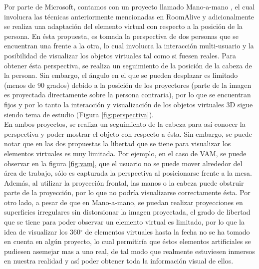 \documentclass[a4paper,openright,12pt]{report}
\begin{document}
Por parte de Microsoft\textregistered, contamos con un proyecto llamado Mano-a-mano \citep{benko2014}, el cual involucra las técnicas anteriormente mencionadas en RoomAlive y adicionalmente se realiza una adaptación del elemento virtual con respecto a la posición de la persona. En ésta propuesta, es tomada la perspectiva de dos personas que se encuentran una frente a la otra, lo cual involucra la interacción multi-usuario y la posibilidad de visualizar los objetos virtuales tal como si fuesen reales. Para obtener ésta perspectiva, se realiza un seguimiento de la posición de la cabeza de la persona. Sin embargo, el ángulo en el que se pueden desplazar es limitado (menos de 90 grados) debido a la posición de los proyectores (parte de la imagen es proyectada directamente sobre la persona contraria), por lo que se encuentran fijos y por lo tanto la interacción y visualización de los objetos virtuales 3D sigue siendo tema de estudio (Figura \ref{fig:perspectiva}).\\
En ambos proyectos, se realiza un seguimiento de la cabeza para así conocer la perspectiva y poder mostrar el objeto con respecto a ésta. Sin embargo, se puede notar que en las dos propuestas la libertad que se tiene para visualizar los elementos virtuales es muy limitada. Por ejemplo, en el caso de VAM, se puede observar en la figura \ref{fig:vam}, que el usuario no se puede mover alrededor del área de trabajo, sólo es capturada la perspectiva al posicionarse frente a la mesa. Además, al utilizar la proyección frontal, las manos o la cabeza puede obstruir parte de la proyección, por lo que no podría visualizarse correctamente ésta. Por otro lado, a pesar de que en Mano-a-mano, se puedan realizar proyecciones en superficies irregulares sin distorsionar la imagen proyectada, el grado de libertad que se tiene para poder observar un elemento virtual es limitado, por lo que la idea de visualizar los 360$^{\circ}$ de elementos virtuales hasta la fecha no se ha tomado en cuenta en algún proyecto, lo cual permitiría que éstos elementos artificiales se pudiesen asemejar mas a uno real, de tal modo que realmente estuviesen inmersos en nuestra realidad y así poder obtener toda la información visual de ellos.

\end{document}
